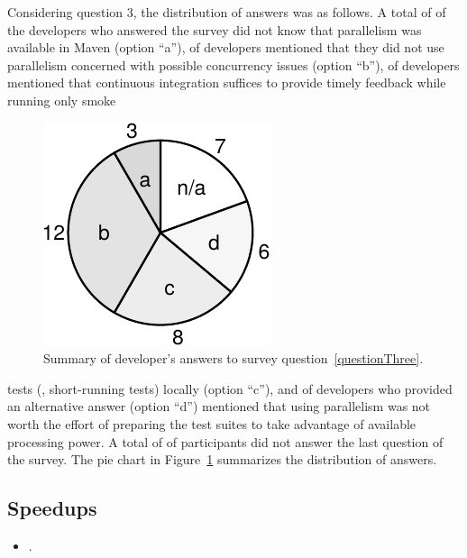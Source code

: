 Considering question 3, the distribution of answers was as follows.  A
total of \emailsA{} of the \emailsProjectsAnswered{} developers who
answered the survey did not know that parallelism was available in
Maven (option ``a''), \emailsB{} of developers mentioned that they did
not use parallelism concerned with possible concurrency issues (option
``b''), \emailsD{} of developers mentioned that continuous integration
suffices to provide timely feedback while running only smoke
\begin{figure}
    \centering
    \includegraphics[width=.15\textwidth]{results/survey.pdf}
    \caption{\label{fig:rq5-answers}Summary of developer's answers to
      survey question~\ref{questionThree}.}
\end{figure}
tests (\ie{}, short-running tests) locally (option ``c''), and \emailsD{} of
developers who provided an alternative answer (option ``d'') mentioned
that using parallelism was not worth the effort of preparing the test
suites to take advantage of available processing power.  A total of
\emailsNA{} of participants did not answer the last question of the
survey.  The pie chart in Figure~\ref{fig:rq5-answers} 
summarizes the distribution of answers.

\begin{center}
\end{center}

\subsection{Speedups}
\label{sec:rqD}

\begin{itemize}
    \item \numRQSpeedupOne{}. \textbf{\RQSpeedupOne}
\end{itemize}

